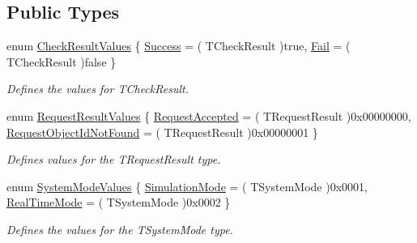 \subsection*{Public Types}
\begin{DoxyCompactItemize}
\item 
enum \hyperlink{class_terra_swarm_1_1_synchronous_1_1_client_connection_response_a915e4d4af1f35e3de466d27d42c57d78}{Check\-Result\-Values} \{ \hyperlink{class_terra_swarm_1_1_synchronous_1_1_client_connection_response_a915e4d4af1f35e3de466d27d42c57d78a3a4dbed8f44a1f0abc1efe7a4ad3d5b0}{Success} = ( T\-Check\-Result )true, 
\hyperlink{class_terra_swarm_1_1_synchronous_1_1_client_connection_response_a915e4d4af1f35e3de466d27d42c57d78a085c06501e85345b78e415907a88203b}{Fail} = ( T\-Check\-Result )false
 \}
\begin{DoxyCompactList}\small\item\em Defines the values for T\-Check\-Result. \end{DoxyCompactList}\item 
enum \hyperlink{class_terra_swarm_1_1_synchronous_1_1_client_connection_response_aab8ffc2f078549c994416633d0aa8fb8}{Request\-Result\-Values} \{ \hyperlink{class_terra_swarm_1_1_synchronous_1_1_client_connection_response_aab8ffc2f078549c994416633d0aa8fb8a25dc7f6bdc925becc175d30660c1f6ec}{Request\-Accepted} = ( T\-Request\-Result )0x00000000, 
\hyperlink{class_terra_swarm_1_1_synchronous_1_1_client_connection_response_aab8ffc2f078549c994416633d0aa8fb8a25a21c0a3a3a6d792215b28d1b566fb2}{Request\-Object\-Id\-Not\-Found} = ( T\-Request\-Result )0x00000001
 \}
\begin{DoxyCompactList}\small\item\em Defines values for the T\-Request\-Result type. \end{DoxyCompactList}\item 
enum \hyperlink{class_terra_swarm_1_1_synchronous_1_1_client_connection_response_a4aacecf0e8e3829b1de3197919a1e60a}{System\-Mode\-Values} \{ \hyperlink{class_terra_swarm_1_1_synchronous_1_1_client_connection_response_a4aacecf0e8e3829b1de3197919a1e60aaa5129160fa9b512de957c03f99faa3f9}{Simulation\-Mode} = ( T\-System\-Mode )0x0001, 
\hyperlink{class_terra_swarm_1_1_synchronous_1_1_client_connection_response_a4aacecf0e8e3829b1de3197919a1e60aaa62f96af700b98db3f35ea6885a541a3}{Real\-Time\-Mode} = ( T\-System\-Mode )0x0002
 \}
\begin{DoxyCompactList}\small\item\em Defines the values for the T\-System\-Mode type. \end{DoxyCompactList}\item 

\end{DoxyCompactItemize}
